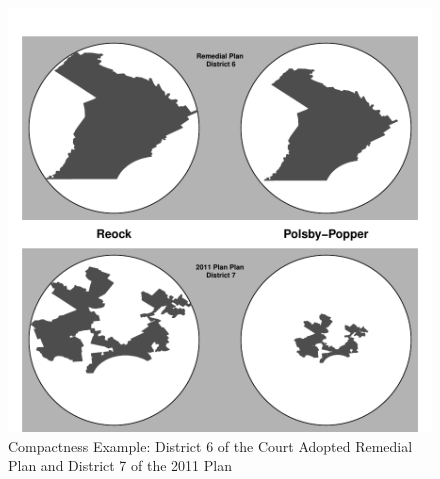 
\begin{figure}
    \begin{center}
    \caption{Compactness Example: District 6 of the Court Adopted Remedial Plan and District 7 of the 2011 Plan}
    \label{fig:compact}
    \includegraphics[width=1\textwidth]{Figures/fig_compactness.pdf}
    \end{center}
\end{figure}
 